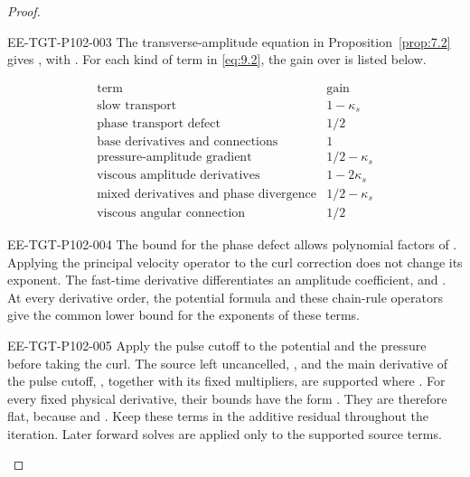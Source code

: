 \begin{proof}
\begin{EESegment}{EE-TGT-P102-003}
The transverse-amplitude equation in Proposition~\ref{prop:7.2} gives
, with
. For each kind of term in
\eqref{eq:9.2}, the gain over  is listed below.
\end{EESegment}
\[
\begin{array}{c|c}
\text{term}&\text{gain}\\ \hline
\text{slow transport}&1-\kappa_s\\
\text{phase transport defect}&1/2\\
\text{base derivatives and connections}&1\\
\text{pressure-amplitude gradient}&1/2-\kappa_s\\
\text{viscous amplitude derivatives}&1-2\kappa_s\\
\text{mixed derivatives and phase divergence}&1/2-\kappa_s\\
\text{viscous angular connection}&1/2
\end{array}
\]
\begin{EESegment}{EE-TGT-P102-004}
The bound for the phase defect allows polynomial factors of
. Applying the principal velocity operator to the curl correction does not
change its exponent. The fast-time derivative differentiates an amplitude coefficient, and
. At every derivative order, the potential formula and
these chain-rule operators give the common lower bound
 for the exponents of these terms.
\end{EESegment}

\begin{EESegment}{EE-TGT-P102-005}
Apply the pulse cutoff to the potential and the pressure before taking the curl. The source left
uncancelled, , and the main derivative of the pulse cutoff,
, together with its fixed multipliers, are supported where
. For every fixed physical derivative, their bounds have the
form . They are therefore flat, because
 and . Keep these terms in the
additive residual throughout the iteration. Later forward solves are applied only to the supported
source terms.
\end{EESegment}
\end{proof}

